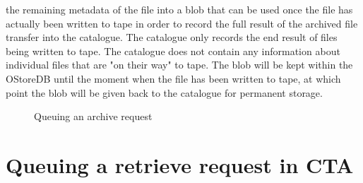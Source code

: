 \documentclass[10pt,a4paper]{article}
\begin{document}
the remaining metadata of the file into a blob that can be used once the file has actually been written to tape in
order to record the full result of the archived file transfer into the catalogue.  The catalogue only records the
end result of files being written to tape.  The catalogue does not contain any information about individual files
that are "on their way" to tape.  The blob will be kept within the OStoreDB until the moment when the file has been
written to tape, at which point the blob will be given back to the catalogue for permanent storage.  \begin{figure}[h]
   \caption{Queuing an archive request} \label{fig:queue_archive}
\end{figure} \newpage \section{Queuing a retrieve request in CTA}
\end{document}
